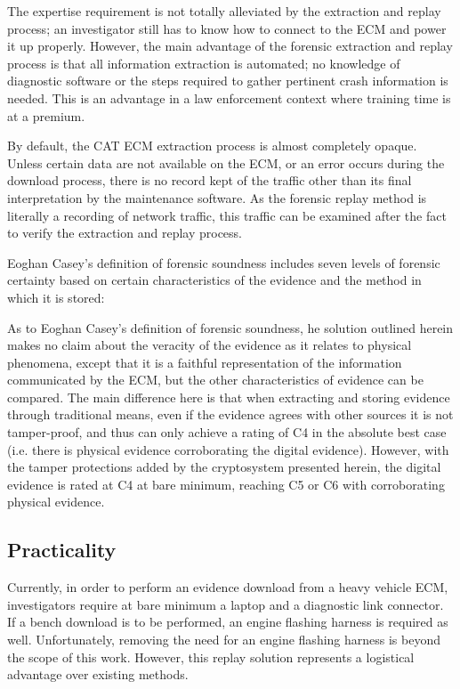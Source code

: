 The expertise requirement is not totally alleviated by the extraction and replay process; an investigator still has to know how to 
connect to the ECM and power it up properly. However, the main advantage of the forensic extraction and replay process is that
all information extraction is automated; no knowledge of diagnostic software or the steps required to gather pertinent crash information
is needed. This is an advantage in a law enforcement context where training time is at a premium.

By default, the CAT ECM extraction process is almost completely opaque. Unless certain data are not available on the ECM, or an error
occurs during the download process, there is no record kept of the traffic other than its final interpretation by the maintenance
software. As the forensic replay method is literally a recording of network traffic, this traffic can be examined after the fact
to verify the extraction and replay process.

Eoghan Casey's definition of forensic soundness includes seven levels of forensic certainty based on certain characteristics
of the evidence and the method in which it is stored:

As to Eoghan Casey's definition of forensic soundness, he solution outlined herein makes no claim about the veracity of the evidence as it relates to physical phenomena, except that it 
is a faithful representation of the information communicated
by the ECM, but the other characteristics of evidence can be compared. The main difference here is that when extracting and storing evidence through traditional means, even if the
evidence agrees with other sources it is not tamper-proof, and thus can only achieve a rating of C4 in the absolute best case (i.e. there is physical evidence corroborating the 
digital evidence). However, with the tamper protections added by the cryptosystem presented herein, the digital evidence is rated at C4 at bare minimum, reaching C5 or C6 with corroborating
physical evidence. 

\subsection{Practicality}

Currently, in order to perform an evidence download from a heavy vehicle ECM, investigators require at bare minimum a laptop and a diagnostic link connector.
If a bench download is to be performed, an engine flashing harness is required as well. Unfortunately, removing the need for an engine flashing harness is
beyond the scope of this work. However, this replay solution represents a logistical advantage over existing methods.

